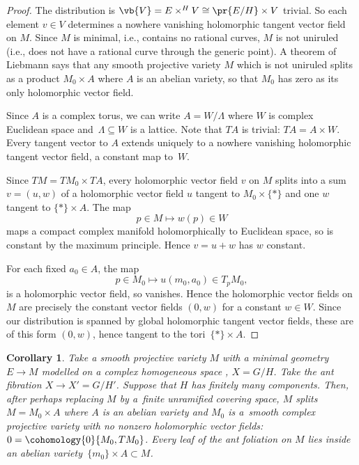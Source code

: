 \documentclass[10pt,a4paper]{amsart}
\numberwithin{equation}{section}
\newtheorem{Corollary}[Theorem]{Corollary}
\begin{document}
\begin{proof}
The distribution is $\vb{V} = E \times^H V \cong \pr{E/H} \times V$ trivial.
So each element $v \in V$ determines a nowhere vanishing holomorphic tangent vector field on $M$.
Since $M$ is minimal, i.e., contains no rational curves, $M$ is not uniruled (i.e., does not have a rational curve through the generic point).
A theorem of Liebmann \cite[Theorem 1.1]{Pereira/Touzet:2012} says that any smooth projective variety $M$ which is not uniruled splits as a product $M_0\times A$ where $A$ is an abelian variety, so that $M_0$ has zero as its only holomorphic vector field.

Since $A$ is a complex torus, we can write $A=W/\Lambda$ where $W$ is complex Euclidean space and~$\Lambda\subseteq W$ is a lattice.
Note that $TA$ is trivial: $TA=A\times W$.
Every tangent vector to $A$ extends uniquely to a nowhere vanishing holomorphic tangent vector field, a constant map to~$W$.

Since $TM=TM_0\times TA$, every holomorphic vector field $v$ on $M$ splits into a sum $v=(u,w)$ of a holomorphic vector field $u$ tangent to $M_0\times\{*\}$ and one $w$ tangent to $\{*\}\times A$.
The map
\[
p\in M\mapsto w(p)\in W
\]
maps a compact complex manifold holomorphically to Euclidean space, so is constant by the maximum principle.
Hence $v=u+w$ has $w$ constant.

For each fixed $a_0\in A$, the map
\[
p\in M_0\mapsto u(m_0,a_0)\in T_p M_0,
\]
is a holomorphic vector field, so vanishes.
Hence the holomorphic vector fields on $M$ are precisely the constant vector fields $(0,w)$ for a constant $w\in W$.
Since our distribution is spanned by global holomorphic tangent vector fields, these are of this form $(0,w)$, hence tangent to the tori~$\{*\}\times A$.
\end{proof}

\begin{Corollary}\label{cor:splitting}
Take a smooth projective variety $M$ with a minimal geometry $E \to M$ modelled on a complex
homogeneous space , $X = G/H$.
Take the ant fibration $X \to X' = G/H'$.
Suppose that $H$ has finitely many components.
Then, after perhaps replacing $M$ by a~finite unramified covering space, $M$ splits
$M = M_0 \times A$ where $A$ is an abelian variety and $M_0$ is a~smooth complex projective
variety with no nonzero holomorphic vector fields: $0 = \cohomology{0}{M_0,TM_0}$.
Every leaf of the ant foliation on $M$ lies inside an abelian variety~${\{m_0\} \times A \subset M}$.
\end{Corollary}
\end{document}
